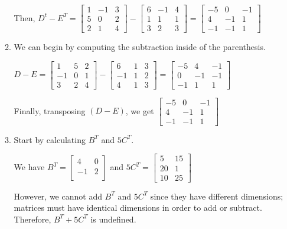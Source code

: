 \documentclass[11pt, letterpaper, twoside]{article}
\begin{document}
\begin{enumerate}
\begin{enumerate}[label=(\alph*)]
Then, $D^t-E^T=\begin{bmatrix}
1 & -1 & 3\\
5 & 0 & 2\\
2 & 1 & 4
\end{bmatrix}-
\begin{bmatrix}
6 & -1 & 4\\
1 & 1 & 1\\
3 & 2 & 3
\end{bmatrix}=\begin{bmatrix}
-5 & 0 & -1\\
4 & -1 & 1\\
-1 & -1 & 1
\end{bmatrix}$
\item We can begin by computing the subtraction inside of the parenthesis.

$D-E=\begin{bmatrix}
1 & 5 & 2\\
-1 & 0 & 1\\
3 & 2 & 4
\end{bmatrix}-\begin{bmatrix}
6 & 1 & 3\\
-1 & 1 & 2\\
4 & 1 & 3
\end{bmatrix}=\begin{bmatrix}
-5 & 4 & -1\\
0 & -1 & -1\\
-1 & 1 & 1
\end{bmatrix}$

Finally, transposing $(D-E)$, we get
$\begin{bmatrix}
-5 & 0 & -1\\
4 & -1 & 1\\
-1 & -1 & 1
\end{bmatrix}$

\item Start by calculating $B^T$ and $5C^T$.

We have $B^T=\begin{bmatrix}
4 & 0\\
-1 & 2\\
\end{bmatrix}$ and $5C^T=\begin{bmatrix}
5 & 15\\
20 & 1\\
10 & 25
\end{bmatrix}$

However, we cannot add $B^T$ and $5C^T$ since they have different dimensions; matrices must have identical dimensions in order to add or subtract. Therefore, $B^T+5C^T$ is undefined.


\end{enumerate}
\end{enumerate}
\end{document}
